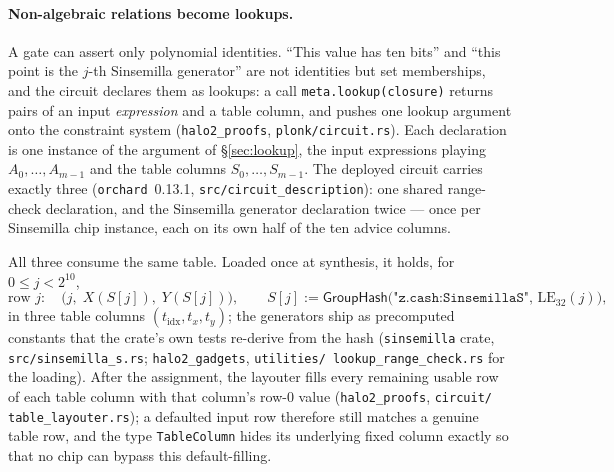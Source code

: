 \documentclass[11pt,a4paper]{article}
\theoremstyle{definition}
\newcommand{\GroupHash}{\ensuremath{\mathsf{GroupHash}}}
\begin{document}
\paragraph{Non-algebraic relations become lookups.}
A gate can assert only polynomial identities. ``This value has ten bits''
and ``this point is the $j$-th Sinsemilla generator'' are not identities but
set memberships, and the circuit declares them as lookups: a call
\texttt{meta.lookup(closure)} returns pairs of an input \emph{expression}
and a table column, and pushes one lookup argument onto the constraint
system (\texttt{halo2\_proofs}, \texttt{plonk/circuit.rs}). Each
declaration is one instance of the argument of \S\ref{sec:lookup}, the
input expressions playing $A_0, \dots, A_{m-1}$ and the table columns
$S_0, \dots, S_{m-1}$. The deployed circuit carries exactly three
(\texttt{orchard}~0.13.1, \texttt{src/circuit\_description}): one shared
range-check declaration, and the Sinsemilla generator declaration twice ---
once per Sinsemilla chip instance, each on its own half of the ten advice
columns.

All three consume the same table. Loaded once at synthesis, it holds, for
$0 \le j < 2^{10}$,
\[
\text{row } j:\quad \bigl( j,\; X(S[j]),\; Y(S[j]) \bigr),
\qquad
S[j] :=
\GroupHash\bigl(\texttt{"z.cash:SinsemillaS"},\, \mathrm{LE}_{32}(j)\bigr),
\]
in three table columns $(t_{\mathrm{idx}}, t_x, t_y)$; the generators ship
as precomputed constants that the crate's own tests re-derive from the
hash (\texttt{sinsemilla} crate, \texttt{src/sinsemilla\_s.rs};
\texttt{halo2\_gadgets}, \texttt{utilities/\allowbreak
lookup\_range\_check.rs} for the
loading). After the assignment, the layouter fills every remaining usable
row of each table column with that column's row-$0$ value
(\texttt{halo2\_proofs}, \texttt{circuit/\allowbreak
table\_layouter.rs}); a defaulted
input row therefore still matches a genuine table row, and the type
\texttt{TableColumn} hides its underlying fixed column exactly so that no
chip can bypass this default-filling.
\end{document}
